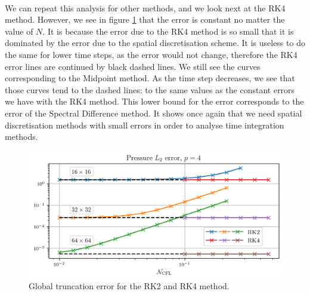       \paragraph{}
      We can repeat this analysis for other methods, and we look next at the RK4 method.
      However, we see in figure \ref{fig:covo_rk2_rk4} that the error is constant no matter the value of $N$.
      It is because the error due to the RK4 method is so small that it is dominated by the error due to the spatial discretisation scheme.
      It is useless to do the same for lower time steps, as the error would not change, therefore the RK4 error lines are continued by black dashed lines.
      We still see the curves corresponding to the Midpoint method.
      As the time step decreases, we see that those curves tend to the dashed lines: to the same values as the constant errors we have with the RK4 method.
      This lower bound for the error corresponds to the error of the Spectral Difference method.
      It shows once again that we need spatial discretisation methods with small errors in order to analyse time integration methods.

      \begin{figure}
        \centering
        \includegraphics{figures/covo_rk2_rk4.png}
        \caption{Global truncation error for the RK2 and RK4 method.}
        \label{fig:covo_rk2_rk4}
      \end{figure}

